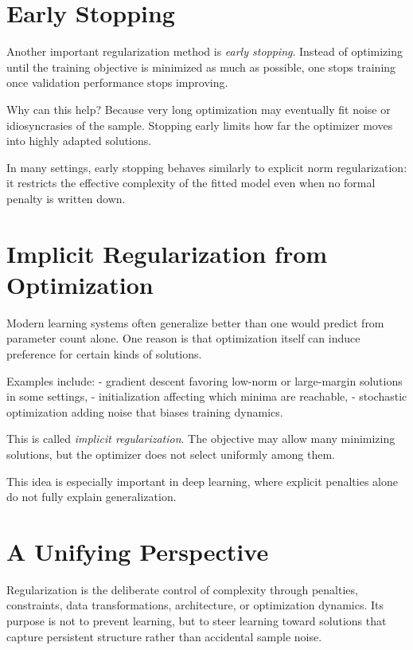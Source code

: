 \section{Early Stopping}

Another important regularization method is \emph{early stopping}. Instead of optimizing until the training objective is minimized as much as possible, one stops training once validation performance stops improving.

Why can this help? Because very long optimization may eventually fit noise or idiosyncrasies of the sample. Stopping early limits how far the optimizer moves into highly adapted solutions.

In many settings, early stopping behaves similarly to explicit norm regularization: it restricts the effective complexity of the fitted model even when no formal penalty is written down.

\section{Implicit Regularization from Optimization}

Modern learning systems often generalize better than one would predict from parameter count alone. One reason is that optimization itself can induce preference for certain kinds of solutions.

Examples include:
- gradient descent favoring low-norm or large-margin solutions in some settings,
- initialization affecting which minima are reachable,
- stochastic optimization adding noise that biases training dynamics.

This is called \emph{implicit regularization}. The objective may allow many minimizing solutions, but the optimizer does not select uniformly among them.

This idea is especially important in deep learning, where explicit penalties alone do not fully explain generalization.

\section{A Unifying Perspective}

Regularization is the deliberate control of complexity through penalties, constraints, data transformations, architecture, or optimization dynamics. Its purpose is not to prevent learning, but to steer learning toward solutions that capture persistent structure rather than accidental sample noise.

